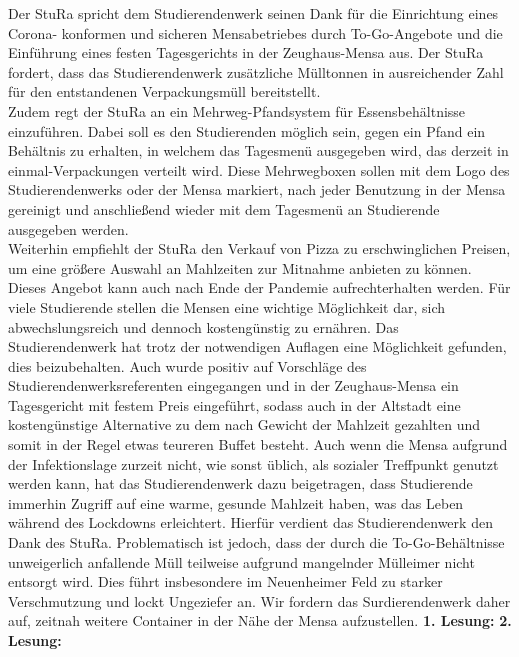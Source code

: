     {
        Der StuRa spricht dem Studierendenwerk seinen Dank für die Einrichtung eines Corona-
        konformen
        und sicheren Mensabetriebes durch To-Go-Angebote und die Einführung eines festen
        Tagesgerichts
        in der Zeughaus-Mensa aus.
        Der StuRa fordert, dass das Studierendenwerk zusätzliche Mülltonnen in ausreichender Zahl für den
        entstandenen
        Verpackungsmüll bereitstellt.\\
        Zudem regt der StuRa an ein Mehrweg-Pfandsystem für Essensbehältnisse einzuführen.
        Dabei soll es den Studierenden möglich sein, gegen ein Pfand ein Behältnis zu erhalten, in welchem
        das Tagesmenü ausgegeben wird, das derzeit in einmal-Verpackungen verteilt wird.
        Diese Mehrwegboxen sollen mit dem Logo des Studierendenwerks oder der Mensa markiert, nach
        jeder Benutzung in der Mensa gereinigt und anschließend wieder mit dem Tagesmenü an
        Studierende ausgegeben werden.\\
        Weiterhin empfiehlt der StuRa den Verkauf von Pizza zu erschwinglichen Preisen, um
        eine größere Auswahl an Mahlzeiten zur Mitnahme anbieten zu können. Dieses Angebot kann auch
        nach Ende der Pandemie aufrechterhalten werden.
    }{
        Für viele Studierende stellen die Mensen eine wichtige Möglichkeit dar, sich abwechslungsreich
        und dennoch kostengünstig zu ernähren. Das Studierendenwerk hat trotz der notwendigen Auflagen
        eine Möglichkeit gefunden, dies beizubehalten. Auch wurde positiv auf Vorschläge des
        Studierendenwerksreferenten eingegangen und in der Zeughaus-Mensa ein Tagesgericht mit festem
        Preis eingeführt, sodass auch in der Altstadt eine kostengünstige Alternative zu dem nach Gewicht
        der Mahlzeit gezahlten und somit in der Regel etwas teureren Buffet besteht.
        Auch wenn die Mensa aufgrund der Infektionslage zurzeit nicht, wie sonst üblich, als sozialer
        Treffpunkt genutzt werden kann, hat das Studierendenwerk dazu beigetragen, dass Studierende
        immerhin Zugriff auf eine warme, gesunde Mahlzeit haben, was das Leben während des
        Lockdowns erleichtert. Hierfür verdient das Studierendenwerk den Dank des StuRa.
        Problematisch ist jedoch, dass der durch die To-Go-Behältnisse unweigerlich anfallende Müll
        teilweise aufgrund mangelnder Mülleimer nicht entsorgt wird. Dies führt insbesondere im 
        Neuenheimer Feld zu starker Verschmutzung und lockt Ungeziefer an. Wir fordern das
        Surdierendenwerk daher auf, zeitnah weitere Container in der Nähe der Mensa aufzustellen.
    }{
        \textbf{1. Lesung:}
        \ul{}
        \textbf{2. Lesung:}
        \ul{}
    }{
    }
